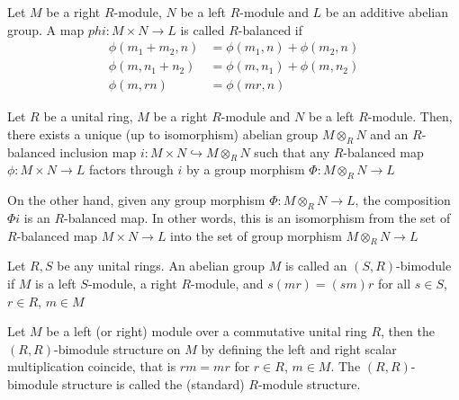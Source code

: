 \begin{definition}
	Let $M$ be a right $R$-module, $N$ be a left $R$-module and $L$ be an additive abelian group. A map $phi: M \times N \to L$ is called $R$-balanced if
	\begin{align*}
		\phi(m_1 + m_2, n) &= \phi(m_1, n) + \phi(m_2, n) \\
		\phi(m, n_1 + n_2) &= \phi(m, n_1) + \phi(m, n_2) \\
		\phi(m, rn) &= \phi(mr, n)
	\end{align*}
\end{definition}

\begin{theorem}
	Let $R$ be a unital ring, $M$ be a right $R$-module and $N$ be a left $R$-module. Then, there exists a unique (up to isomorphism) abelian group $M \otimes_R N$ and an $R$-balanced inclusion map $i: M \times N \hookrightarrow M \otimes_R N$ such that any $R$-balanced map $\phi: M \times N \to L$ factors through $i$ by a group morphism $\Phi: M \otimes_R N \to L$
	\begin{center}
	\end{center}
	
	On the other hand, given any group morphism $\Phi: M \otimes_R N \to L$, the composition $\Phi i$ is an $R$-balanced map. In other words, this is an isomorphism from the set of $R$-balanced map $M \times N \to L$ into the set of group morphism $M \otimes_R N \to L$
\end{theorem}

\begin{definition}[bimodule]
	Let $R, S$ be any unital rings. An abelian group $M$ is called an $(S, R)$-bimodule if $M$ is a left $S$-module, a right $R$-module, and $s(mr) = (sm)r$ for all $s \in S$, $r \in R$, $m \in M$
\end{definition}

\begin{definition}
	Let $M$ be a left (or right) module over a commutative unital ring $R$, then the $(R, R)$-bimodule structure on $M$ by defining the left and right scalar multiplication coincide, that is $rm = mr$ for $r \in R$, $m \in M$. The $(R, R)$-bimodule structure is called the (standard) $R$-module structure.
\end{definition}


